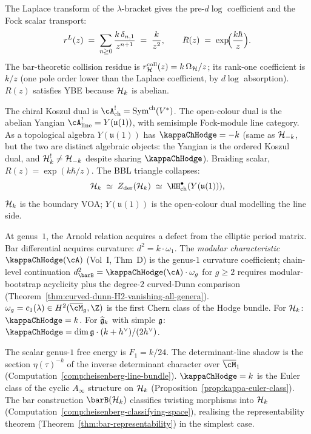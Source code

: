 The Laplace transform of the $\lambda$-bracket gives the
pre-\textup{\(d\log\)} coefficient and the Fock scalar transport:
\[
r^L(z) \;=\; \sum_{n \geq 0} \frac{k\,\delta_{n,1}}{z^{n+1}}
\;=\; \frac{k}{z^2},
\qquad
R(z) \;=\; \exp\!\Bigl(\frac{k\hbar}{z}\Bigr).
\]
The bar-theoretic collision residue is
$r^{\mathrm{coll}}_{\mathcal{H}}(z)=k\,\Omega_{\mathcal{H}}/z$; its
rank-one coefficient is $k/z$ (one pole order lower than the
Laplace coefficient, by $d\log$ absorption). $R(z)$
satisfies YBE because $\mathcal{H}_k$ is abelian.

The chiral Koszul dual is
$\cA^!_{\mathrm{ch}} = \mathrm{Sym}^{\mathrm{ch}}(V^*)$. The
open-colour dual is the abelian Yangian
$\cA^!_{\mathrm{line}} = Y(\mathfrak{u}(1))$, with semisimple
Fock-module line category. As a topological algebra
$Y(\mathfrak{u}(1))$ has $\kappaChHodge = -k$ (same as
$\mathcal{H}_{-k}$, but the two are distinct algebraic objects: the
Yangian is the ordered Koszul dual, and $\mathcal{H}_k^! \neq \mathcal{H}_{-k}$
despite sharing $\kappaChHodge$). Braiding scalar,
$R(z) = \exp(k\hbar/z)$. The BBL
triangle collapses:
\[
\cH_k
\;\simeq\;
Z_{\mathrm{der}}(\cH_k)
\;\simeq\;
\HH^\bullet_{\mathrm{ch}}(Y(\mathfrak{u}(1))),
\]
$\mathcal{H}_k$ is the boundary VOA; $Y(\mathfrak{u}(1))$ is the
open-colour dual modelling the line side.

At genus~$1$, the Arnold relation acquires a defect from the
elliptic period matrix. Bar differential acquires curvature:
$d^2 = k \cdot \omega_1$. The \emph{modular characteristic}
$\kappaChHodge(\cA)$ (Vol~I, Thm~D) is the genus-$1$
curvature coefficient; chain-level continuation
$d_{\barB}^2 = \kappaChHodge(\cA) \cdot \omega_g$ for
$g \ge 2$ requires modular-bootstrap acyclicity plus the
degree-$2$ curved-Dunn comparison
(Theorem~\ref{thm:curved-dunn-H2-vanishing-all-genera}).
$\omega_g = c_1(\lambda) \in H^2(\overline{\cM}_g, \Z)$ is the
first Chern class of the Hodge bundle. For $\mathcal{H}_k$:
$\kappaChHodge = k$. For $\widehat{\mathfrak{g}}_k$ with simple
$\mathfrak{g}$: $\kappaChHodge = \dim\fg \cdot (k + h^\vee)/(2h^\vee)$.

The scalar genus-$1$ free energy is $F_1=k/24$. The determinant-line
shadow is the section $\eta(\tau)^{-k}$ of the inverse determinant
character over $\overline{\cM}_1$
(Computation~\ref{comp:heisenberg-line-bundle}).
$\kappaChHodge = k$ is the Euler class of the cyclic
$A_\infty$ structure on $\mathcal{H}_k$
(Proposition~\ref{prop:kappa-euler-class}). The bar construction
$\barB(\cH_k)$ classifies twisting morphisms into $\mathcal{H}_k$
(Computation~\ref{comp:heisenberg-classifying-space}), realising
the representability theorem
(Theorem~\ref{thm:bar-representability}) in the simplest case.

